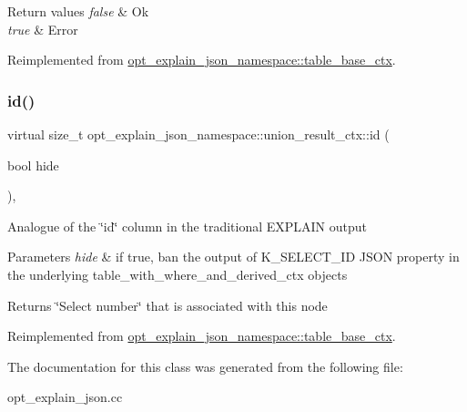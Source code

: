 \begin{DoxyRetVals}{Return values}
{\em false} & Ok \\
\hline
{\em true} & Error \\
\hline
\end{DoxyRetVals}


Reimplemented from \mbox{\hyperlink{classopt__explain__json__namespace_1_1table__base__ctx_a3b2b6db7328abbca2a584faea135cb31}{opt\+\_\+explain\+\_\+json\+\_\+namespace\+::table\+\_\+base\+\_\+ctx}}.

\mbox{\label{classopt__explain__json__namespace_1_1union__result__ctx_af03161b8ce22f7a3e95489dd1be62118}} 
\subsubsection{\texorpdfstring{id()}{id()}}
{\footnotesize\ttfamily virtual size\+\_\+t opt\+\_\+explain\+\_\+json\+\_\+namespace\+::union\+\_\+result\+\_\+ctx\+::id (\begin{DoxyParamCaption}\item[{bool}]{hide }\end{DoxyParamCaption})\hspace{0.3cm}{\ttfamily [inline]}, {\ttfamily [virtual]}}

Analogue of the \char`\"{}id\char`\"{} column in the traditional E\+X\+P\+L\+A\+IN output


\begin{DoxyParams}{Parameters}
{\em hide} & if true, ban the output of K\+\_\+\+S\+E\+L\+E\+C\+T\+\_\+\+ID J\+S\+ON property in the underlying table\+\_\+with\+\_\+where\+\_\+and\+\_\+derived\+\_\+ctx objects\\
\hline
\end{DoxyParams}
\begin{DoxyReturn}{Returns}
\char`\"{}\+Select number\char`\"{} that is associated with this node 
\end{DoxyReturn}


Reimplemented from \mbox{\hyperlink{classopt__explain__json__namespace_1_1table__base__ctx_afc1c98638ff3c4cc5b33ef99164cb144}{opt\+\_\+explain\+\_\+json\+\_\+namespace\+::table\+\_\+base\+\_\+ctx}}.



The documentation for this class was generated from the following file\+:\begin{DoxyCompactItemize}
\item 
opt\+\_\+explain\+\_\+json.\+cc\end{DoxyCompactItemize}
